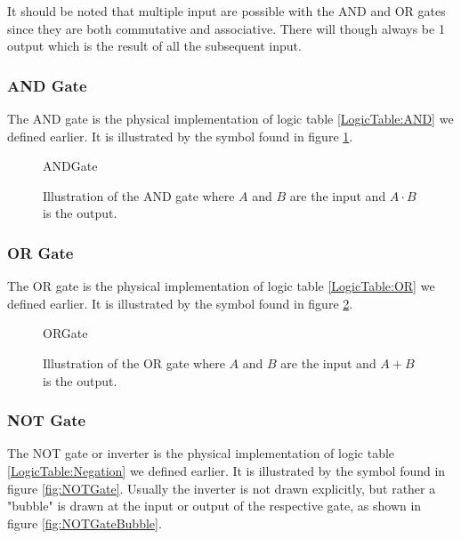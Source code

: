             It should be noted that multiple input are possible with the AND and OR gates since they are both commutative and associative. There will though always be 1 output which is the result of all the subsequent input.
            
            \subsubsection{AND Gate}
                The AND gate is the physical implementation of logic table \ref{LogicTable:AND} we defined earlier. It is illustrated by the symbol found in figure \ref{fig:ANDGate}. 
                
                \begin{figure}[h!]
                    \centering
                    {ANDGate}
                    \caption{Illustration of the AND gate where $A$ and $B$ are the input and $A\cdot B$ is the output.}
                    \label{fig:ANDGate}
                \end{figure}
            
            \subsubsection{OR Gate}
            
                The OR gate is the physical implementation of logic table \ref{LogicTable:OR} we defined earlier. It is illustrated by the symbol found in figure \ref{fig:ORGate}. 
                
                \begin{figure}[h!]
                    \centering
                    {ORGate}
                    \caption{Illustration of the OR gate where $A$ and $B$ are the input and $A+B$ is the output.}
                    \label{fig:ORGate}
                \end{figure} 
            
            \subsubsection{NOT Gate}
            
                The NOT gate or inverter is the physical implementation of logic table \ref{LogicTable:Negation} we defined earlier. It is illustrated by the symbol found in figure \ref{fig:NOTGate}. Usually the inverter is not drawn explicitly, but rather a "bubble" is drawn at the input or output of the respective gate, as shown in figure \ref{fig:NOTGateBubble}. 
                
